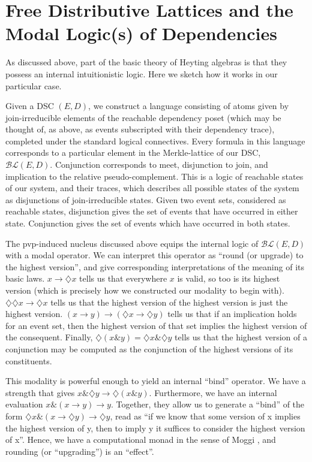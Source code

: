 \documentclass[hoptionsi,review,screen,format=sigconf]{acmart}
\theoremstyle{definition}
\newcommand{\BLc}{\mathcal{BL}}
\newcommand{\band}{\mathop{\&}}
\newcommand{\Dia}{\diamondsuit}
\begin{document}
\section{Free Distributive Lattices and the Modal Logic(s) of Dependencies}
As discussed above, part of the basic theory of Heyting algebras is that they possess an internal intuitionistic logic. Here we sketch how it works in our particular case.

Given a DSC \((E,D)\), we construct a language consisting of atoms given by join-irreducible elements of the reachable dependency poset (which may be thought of, as above, as events subscripted with their dependency trace), completed under the standard logical connectives. Every formula in this language corresponds to a particular element in the Merkle-lattice of our DSC, \(\BLc(E,D)\).  Conjunction corresponds to meet, disjunction to join, and implication to the relative pseudo-complement. This is a logic of reachable states of our system, and their traces, which describes all possible states of the system as disjunctions of join-irreducible states. Given two event sets, considered as reachable states, disjunction gives the set of events that have occurred in either state. Conjunction gives the set of events which have occurred in both states.


The pvp-induced nucleus discussed above equips the internal logic of \(\BLc(E,D)\) with a modal operator. We can interpret this operator as ``round (or upgrade) to the highest version'', and give corresponding interpretations of the meaning of its basic laws. \(x \rightarrow \Dia{x}\) tells us that everywhere \(x\) is valid, so too is its highest version (which is precisely how we constructed our modality to begin with). \(\Dia\Dia{x} \rightarrow \Dia{x}\) tells us that the highest version of the highest version is just the highest version. \((x \rightarrow y) \rightarrow (\Dia{x} \rightarrow \Dia{y})\)  tells us that if an implication holds for an event set, then the highest version of that set implies the highest version of the consequent. Finally, \(\Dia(x \band y) = \Dia{x} \band \Dia{y}\) tells us that the highest version of a conjunction may be computed as the conjunction of the highest versions of its constituents.

This modality is powerful enough to yield an internal ``bind'' operator. We have a strength that gives \(x \band \Dia{y} \rightarrow \Dia(x \band y)\). Furthermore, we have an internal evaluation \(x \band (x \rightarrow y) \rightarrow y\). Together, they allow us to generate a ``bind'' of the form \(\Dia{x} \band (x \rightarrow \Dia{y}) \rightarrow \Dia{y}\), read as ``if we know that some version of x implies the highest version of y, then to imply y it suffices to consider the highest version of x''. Hence, we have a computational monad in the sense of Moggi \cite{moggi1991notions}, and rounding (or ``upgrading'') is an ``effect''. 
\end{document}
